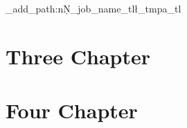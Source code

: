 \documentclass[12pt]{UWMadThesis}
\begin{document}
\MakeTitlePage{}

\begin{LicensePage}
    \CreativeCommons
    \Attribution
    \NonCommercial
    \ShareAlike
\end{LicensePage}

\TableOfContents

\acknowledgments{}
\lipsum[1]

\abstract
\lipsum[2-3]


\begin{Nomenclature}
\end{Nomenclature}

\ExplSyntaxOn
    \file_add_path:nN{\c_job_name_tl}\l_tmpa_tl
\ExplSyntaxOff
{}


\chapter{Three Chapter}
\lipsum[2-3]


\chapter{Four Chapter}
\lipsum[4-6]


\lipsum[7-9]


\lipsum[10-15]

\show\doublespacing
\end{document}
